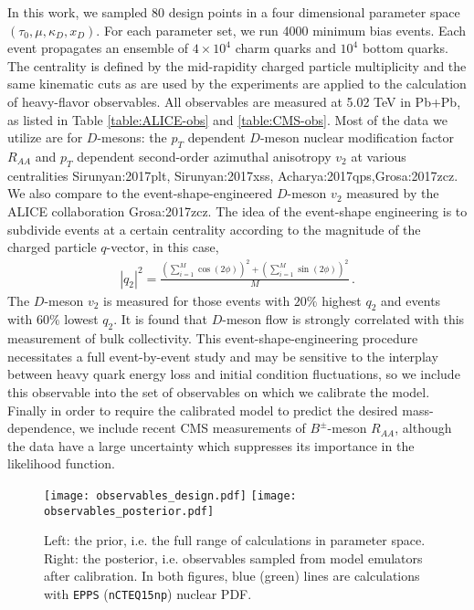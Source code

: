 In this work, we sampled 80 design points in a four dimensional parameter space $(\tau_0, \mu, \kappa_D, x_D)$.
For each parameter set, we run 4000 minimum bias events.
Each event propagates an ensemble of $4\times 10^4$ charm quarks and $10^4$ bottom quarks.
The centrality is defined by the mid-rapidity charged particle multiplicity and the same kinematic cuts as are used by the experiments are applied to the calculation of heavy-flavor observables.
All observables are measured at 5.02 TeV in Pb+Pb, as listed in Table \ref{table:ALICE-obs} and \ref{table:CMS-obs}. Most of the data we utilize are for $D$-mesons: the
 $p_T$ dependent $D$-meson nuclear modification factor $R_{AA}$ and $p_T$ dependent second-order azimuthal anisotropy $v_2$ at various centralities {Sirunyan:2017plt, Sirunyan:2017xss, Acharya:2017qps,Grosa:2017zcz}.
We also compare to the event-shape-engineered $D$-meson $v_2$ measured by the  ALICE collaboration {Grosa:2017zcz}.
The idea of the event-shape engineering is to subdivide events at a certain centrality according to the magnitude of the charged particle $q$-vector, in this case,
\begin{eqnarray}
|q_2|^2 = \frac{\left(\sum_{i=1}^{M} \cos(2\phi) \right)^2+ \left(\sum_{i=1}^{M} \sin(2\phi) \right)^2}{M} \, .
\end{eqnarray}
The $D$-meson $v_2$ is measured for those events with $20\%$ highest $q_2$ and events with $60\%$ lowest $q_2$.
It is found that $D$-meson flow is strongly correlated with this measurement of bulk collectivity.
This event-shape-engineering procedure necessitates a full event-by-event study and may be sensitive to the interplay between heavy quark energy loss and initial condition fluctuations, so we include this observable into the set of observables on which we calibrate the model.
Finally in order to require the calibrated model to predict the desired mass-dependence, we include recent CMS measurements of $B^{\pm}$-meson $R_{AA}$, although the data have a large uncertainty which suppresses its importance in the likelihood function.
\begin{figure*}
\texttt{[image: observables\_design.pdf]}
\texttt{[image: observables\_posterior.pdf]}
\caption{Left: the prior, i.e. the full range of calculations in parameter space. Right: the posterior, i.e. observables sampled from model emulators after calibration. In both figures, blue (green) lines are calculations with {\tt EPPS} ({\tt nCTEQ15np}) nuclear PDF.}\label{plots:deisgn_posterior_obs}
\end{figure*}

